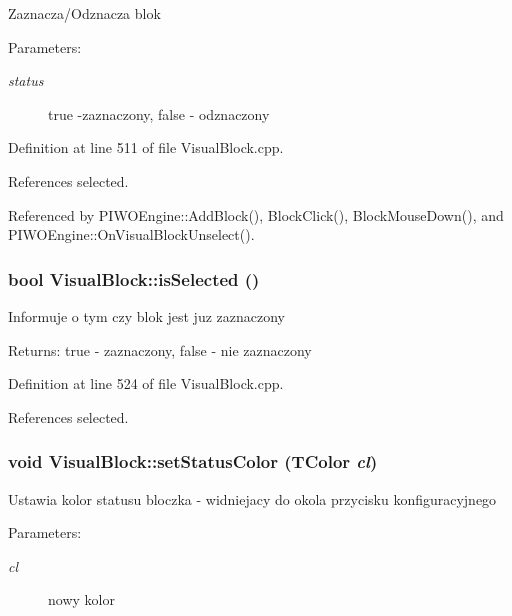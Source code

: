 Zaznacza/Odznacza blok \begin{Desc}
\item[Parameters:]
\begin{description}
\item[{\em status}]true -zaznaczony, false - odznaczony \end{description}
\end{Desc}


Definition at line 511 of file VisualBlock.cpp.

References selected.

Referenced by PIWOEngine::AddBlock(), BlockClick(), BlockMouseDown(), and PIWOEngine::OnVisualBlockUnselect().\hypertarget{classVisualBlock_046a93138fb3800d114e176ab9e4c164}{
\subsubsection[isSelected]{\setlength{\rightskip}{0pt plus 5cm}bool VisualBlock::isSelected ()}}
\label{classVisualBlock_046a93138fb3800d114e176ab9e4c164}


Informuje o tym czy blok jest juz zaznaczony \begin{Desc}
\item[Returns:]true - zaznaczony, false - nie zaznaczony \end{Desc}


Definition at line 524 of file VisualBlock.cpp.

References selected.\hypertarget{classVisualBlock_849044a8c705427b0bce5a6808e53115}{
\subsubsection[setStatusColor]{\setlength{\rightskip}{0pt plus 5cm}void VisualBlock::setStatusColor (TColor {\em cl})}}
\label{classVisualBlock_849044a8c705427b0bce5a6808e53115}


Ustawia kolor statusu bloczka - widniejacy do okola przycisku konfiguracyjnego \begin{Desc}
\item[Parameters:]
\begin{description}
\item[{\em cl}]nowy kolor \end{description}
\end{Desc}


